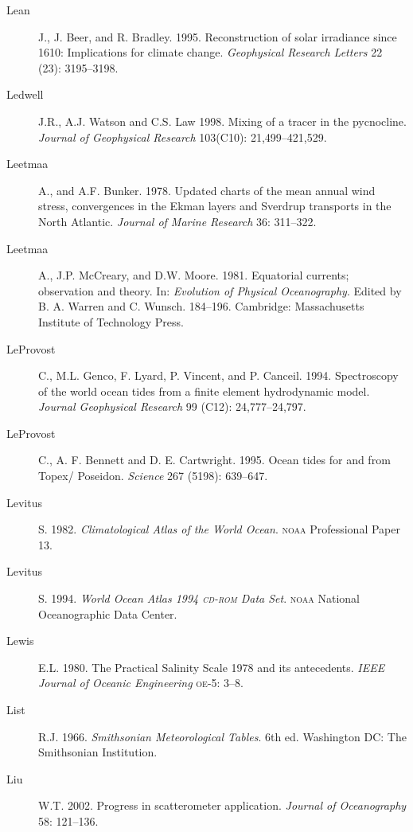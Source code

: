 \begin{description}
\item [Lean]J., J. Beer, and R. Bradley. 1995. Reconstruction of solar
irradiance since 1610: Implications for climate change. \textit{Geophysical
Research Letters} 22 (23): 3195--3198.

\item [Ledwell]J.R., A.J. Watson and C.S. Law 1998. Mixing of a tracer in the pycnocline. \textit{Journal of Geophysical Research} 103(C10): 21,499--421,529.

\item[Leetmaa]A., and A.F. Bunker. 1978. Updated charts of the
mean annual wind stress, convergences in the Ekman layers and Sverdrup transports
in the North Atlantic. \textit{Journal of Marine Research} 36: 311--322.

\item[Leetmaa]A., J.P. McCreary, and D.W. Moore. 1981. Equatorial currents;
observation and theory. In: \textit{Evolution of Physical Oceanography}. Edited
by B. A. Warren and C. Wunsch. 184--196. Cambridge: Massachusetts Institute of Technology Press.

\item [LeProvost]C., M.L. Genco, F. Lyard, P. Vincent, and P. Canceil. 1994. Spectroscopy of the world ocean tides from a finite element hydrodynamic model. \textit{Journal Geophysical Research} 99 (C12): 24,777--24,797.

\item [LeProvost]C., A. F. Bennett and D. E. Cartwright. 1995. Ocean tides for and from Topex/ Poseidon. \textit{Science} 267 (5198): 639--647.

\item [Levitus]S. 1982. \textit{Climatological Atlas of the World Ocean}. \textsc{noaa} Professional Paper 13.

\item [Levitus]S. 1994. \textit{World Ocean Atlas 1994 \textsc{cd-rom} Data Set}. \textsc{noaa} National Oceanographic Data Center.

\item [Lewis]E.L. 1980. The Practical Salinity
Scale 1978 and its antecedents.
\textit{IEEE Journal of Oceanic Engineering} \textsc{oe}-5: 3--8.

\item [List]R.J. 1966. \textit{Smithsonian Meteorological Tables}. 6th ed. Washington DC: The Smithsonian Institution.

\item [Liu]W.T. 2002. Progress in scatterometer application. \textit{Journal of Oceanography} 58: 121--136.


\end{description}
